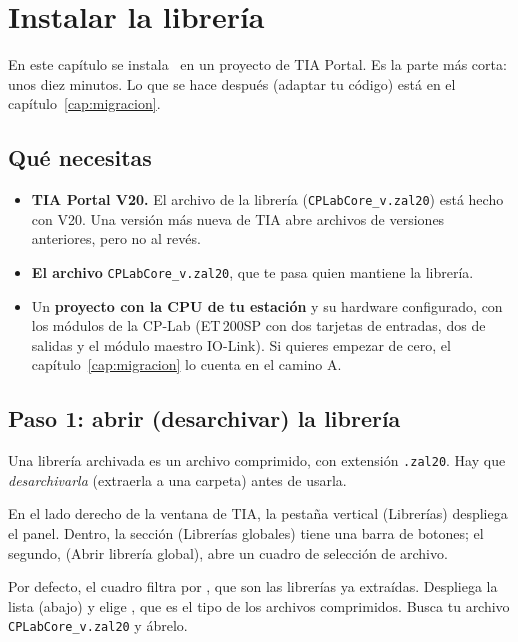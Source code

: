 \chapter{Instalar la librería}\label{cap:instalacion}

En este capítulo se instala \lib\ en un proyecto de TIA Portal. Es la parte más corta: unos diez minutos. Lo que se hace después (adaptar tu código) está en el capítulo~\ref{cap:migracion}.

\section{Qué necesitas}
\begin{itemize}
\item \textbf{TIA Portal V20.} El archivo de la librería (\texttt{CPLabCore\_v\vlib.zal20}) está hecho con V20. Una versión más nueva de TIA abre archivos de versiones anteriores, pero no al revés.
\item \textbf{El archivo} \texttt{CPLabCore\_v\vlib.zal20}, que te pasa quien mantiene la librería.
\item Un \textbf{proyecto con la CPU de tu estación} y su hardware configurado, con los módulos de la CP-Lab (ET\,200SP con dos tarjetas de entradas, dos de salidas y el módulo maestro IO-Link). Si quieres empezar de cero, el capítulo~\ref{cap:migracion} lo cuenta en el camino A.
\end{itemize}

\section{Paso 1: abrir (desarchivar) la librería}\label{sec:abrir-libreria}
Una librería archivada es un archivo comprimido, con extensión \texttt{.zal20}. Hay que \emph{desarchivarla} (extraerla a una carpeta) antes de usarla.

\reiniciapaso
{}
En el lado derecho de la ventana de TIA, la pestaña vertical  (Librerías) despliega el panel. Dentro, la sección  (Librerías globales) tiene una barra de botones; el segundo,  (Abrir librería global), abre un cuadro de selección de archivo.

Por defecto, el cuadro filtra por , que son las librerías ya extraídas. Despliega la lista  (abajo) y elige , que es el tipo de los archivos comprimidos. Busca tu archivo \texttt{CPLabCore\_v\vlib.zal20} y ábrelo.

